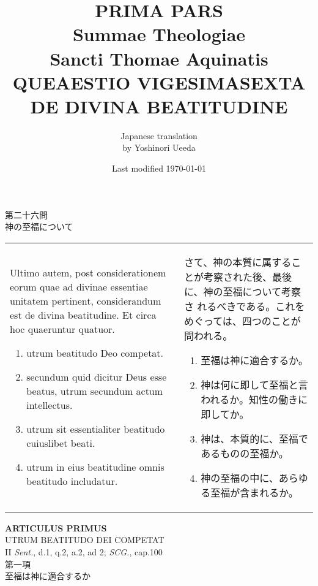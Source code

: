 \documentclass[10pt]{jsarticle} %
\title{{\bf PRIMA PARS}\\{\HUGE Summae Theologiae}\\Sancti Thomae
Aquinatis\\{\sffamily QUEAESTIO VIGESIMASEXTA}\\DE DIVINA
BEATITUDINE}
\author{Japanese translation\\by Yoshinori {\sc Ueeda}}
\date{Last modified \today}
\begin{document}
\maketitle

\begin{center}
{\Large 第二十六問\\神の至福について}
\end{center}


\begin{longtable}{p{21em}p{21em}}



{\Huge U}ltimo autem, post considerationem eorum quae ad divinae essentiae
 unitatem pertinent, considerandum est de divina beatitudine. Et circa
 hoc quaeruntur quatuor. 

\begin{enumerate}
 \item utrum beatitudo Deo competat.
 \item secundum quid dicitur Deus esse beatus, utrum secundum actum
 intellectus. 
 \item utrum sit essentialiter beatitudo cuiuslibet
 beati.
 \item utrum in eius beatitudine omnis beatitudo includatur.
\end{enumerate}

&

さて、神の本質に属することが考察された後、最後に、神の至福について考察さ
 れるべきである。これをめぐっては、四つのことが問われる。

\begin{enumerate}
 \item 至福は神に適合するか。
 \item 神は何に即して至福と言われるか。知性の働きに即してか。
 \item 神は、本質的に、至福であるものの至福か。
 \item 神の至福の中に、あらゆる至福が含まれるか。
\end{enumerate}

\end{longtable}

\newpage

\begin{center}
 {\Large {\bf ARTICULUS PRIMUS}}\\
 {\large UTRUM BEATITUDO DEI COMPETAT}\\
 {\footnotesize II {\itshape Sent.}, d.1, q.2, a.2, ad 2; {\itshape
 SCG.}, cap.100}\\
 {\Large 第一項\\至福は神に適合するか}
\end{center}
\end{document}
